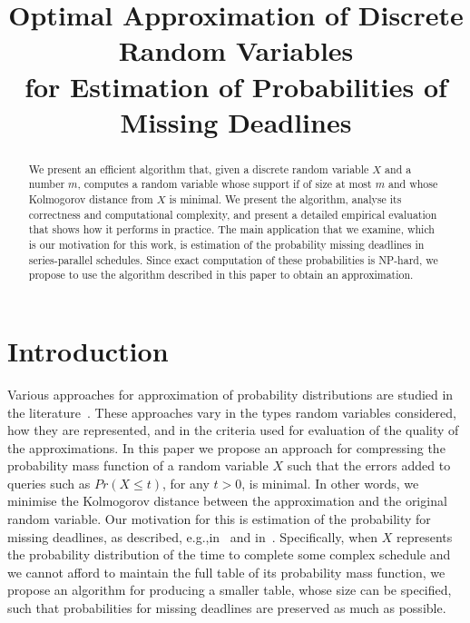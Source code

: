 \documentclass[letterpaper]{article} %
\begin{document}
\title{Optimal Approximation of Discrete Random Variables \\ for Estimation of Probabilities of Missing Deadlines}
\author{}
\maketitle
\begin{abstract}
We present an efficient algorithm that, given a discrete random variable $X$ and a number $m$, computes a random variable whose support if of size at most $m$ and whose Kolmogorov distance from $X$ is minimal. We present the algorithm, analyse its correctness and computational complexity, and present a detailed empirical evaluation that shows how it performs in practice. The main application that we examine, which is our motivation for this work, is estimation of the probability missing deadlines in series-parallel schedules. Since exact computation of these probabilities is NP-hard, we propose to use the algorithm described in this paper to obtain an approximation.   
\end{abstract}


\section{Introduction}


Various approaches for approximation of probability distributions are studied in the literature~\cite{AMCR83,pavlikov2016cvar,PS77,vidyasagar2012metric,cohen2015estimating,CohenGW18}. 
These approaches vary in the types random variables considered, how they are represented, and in the criteria used for evaluation of the quality of the approximations. In this paper we propose an approach for compressing the probability mass function of a random variable $X$ such that the errors added to queries such as $Pr(X\leq t)$, for  any $t>0$, is minimal. In other words, we minimise the Kolmogorov distance between the approximation and the original random variable. Our motivation for this is estimation of the probability for missing deadlines, as described, e.g.,in~\cite{cohen2015estimating} and in~\cite{Kashef18}. Specifically, when $X$ represents the probability distribution of the time to complete some complex schedule and we cannot afford to maintain the full table of its probability mass function, we propose an algorithm for producing a smaller table, whose size can be specified, such that probabilities for missing deadlines are preserved as much as possible. 
\end{document}
